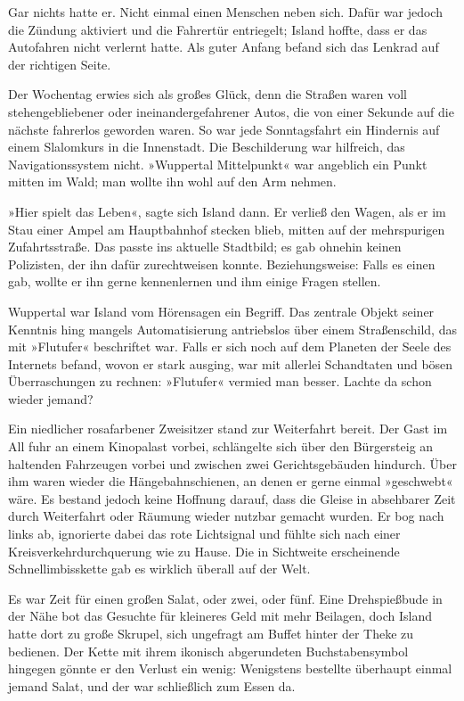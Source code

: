 Gar nichts hatte er. Nicht einmal einen Menschen neben sich. Dafür war jedoch die Zündung aktiviert und die Fahrertür entriegelt; Island hoffte, dass er das Autofahren nicht verlernt hatte. Als guter Anfang befand sich das Lenkrad auf der richtigen Seite.

Der Wochentag erwies sich als großes Glück, denn die Straßen waren voll stehengebliebener oder ineinandergefahrener Autos, die von einer Sekunde auf die nächste fahrerlos geworden waren. So war jede Sonntagsfahrt ein Hindernis auf einem Slalomkurs in die Innenstadt. Die Beschilderung war hilfreich, das Navigationssystem nicht. »Wuppertal Mittelpunkt« war angeblich ein Punkt mitten im Wald; man wollte ihn wohl auf den Arm nehmen.

»Hier spielt das Leben«, sagte sich Island dann. Er verließ den Wagen, als er im Stau einer Ampel am Hauptbahnhof stecken blieb, mitten auf der mehrspurigen Zufahrtsstraße. Das passte ins aktuelle Stadtbild; es gab ohnehin keinen Polizisten, der ihn dafür zurechtweisen konnte. Beziehungsweise: Falls es einen gab, wollte er ihn gerne kennenlernen und ihm einige Fragen stellen.

Wuppertal war Island vom Hörensagen ein Begriff. Das zentrale Objekt seiner Kenntnis hing mangels Automatisierung antriebslos über einem Straßenschild, das mit »Flutufer« beschriftet war. Falls er sich noch auf dem Planeten der Seele des Internets befand, wovon er stark ausging, war mit allerlei Schandtaten und bösen Überraschungen zu rechnen: »Flutufer« vermied man besser. Lachte da schon wieder jemand?

Ein niedlicher rosafarbener Zweisitzer stand zur Weiterfahrt bereit. Der Gast im All fuhr an einem Kinopalast vorbei, schlängelte sich über den Bürgersteig an haltenden Fahrzeugen vorbei und zwischen zwei Gerichtsgebäuden hindurch. Über ihm waren wieder die Hängebahnschienen, an denen er gerne einmal »geschwebt« wäre. Es bestand jedoch keine Hoffnung darauf, dass die Gleise in absehbarer Zeit durch Weiterfahrt oder Räumung wieder nutzbar gemacht wurden. Er bog nach links ab, ignorierte dabei das rote Lichtsignal und fühlte sich nach einer Kreisverkehrdurchquerung wie zu Hause. Die in Sichtweite erscheinende Schnellimbisskette gab es wirklich überall auf der Welt.

Es war Zeit für einen großen Salat, oder zwei, oder fünf. Eine Drehspießbude in der Nähe bot das Gesuchte für kleineres Geld mit mehr Beilagen, doch Island hatte dort zu große Skrupel, sich ungefragt am Buffet hinter der Theke zu bedienen. Der Kette mit ihrem ikonisch abgerundeten Buchstabensymbol hingegen gönnte er den Verlust ein wenig: Wenigstens bestellte überhaupt einmal jemand Salat, und der war schließlich zum Essen da.



